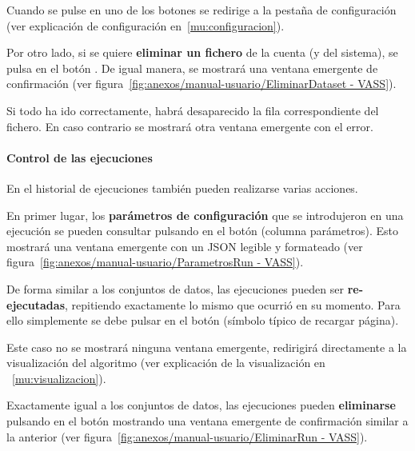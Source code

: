Cuando se pulse en uno de los botones se redirige a la pestaña de configuración
(ver explicación de configuración en~\ref{mu:configuracion}).

\label{mu:eliminardataset}
Por otro lado, si se quiere \textbf{eliminar un fichero} de la cuenta (y del
sistema), se pulsa en el botón \button[vassred]{\faTrash}. De igual manera, se
mostrará una ventana emergente de confirmación (ver
figura~\ref{fig:anexos/manual-usuario/EliminarDataset - VASS}).


Si todo ha ido correctamente, habrá desaparecido la fila correspondiente del
fichero. En caso contrario se mostrará otra ventana emergente con el error.

\paragraph{Control de las ejecuciones} En el historial de ejecuciones también
pueden realizarse varias acciones.

\label{mu:parametrosrun}
En primer lugar, los \textbf{parámetros de configuración} que se introdujeron en
una ejecución se pueden consultar pulsando en el botón
\button[vassgreen]{\faFileTextO} (columna parámetros). Esto mostrará una ventana
emergente con un JSON legible y formateado (ver
figura~\ref{fig:anexos/manual-usuario/ParametrosRun - VASS}).


De forma similar a los conjuntos de datos, las ejecuciones pueden ser
\textbf{re-ejecutadas}, repitiendo exactamente lo mismo que ocurrió en su
momento. Para ello simplemente se debe pulsar en el botón
\button[vassgold]{\faRotateRight} (símbolo típico de recargar página).

Este caso no se mostrará ninguna ventana emergente, redirigirá directamente a la
visualización del algoritmo (ver explicación de la visualización en
~\ref{mu:visualizacion}).

\label{mu:eliminarrun}
Exactamente igual a los conjuntos de datos, las ejecuciones pueden
\textbf{eliminarse} pulsando en el botón \button[vassred]{\faTrash} mostrando
una ventana emergente de confirmación similar a la anterior (ver
figura~\ref{fig:anexos/manual-usuario/EliminarRun - VASS}).




